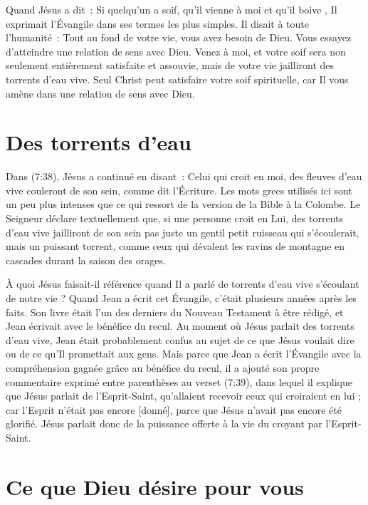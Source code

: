 Quand Jésus a dit~: \og Si quelqu'un a soif, qu'il vienne à moi
 et qu'il boive \fg{}, Il exprimait l'Évangile dans ses termes
 les plus simples. Il disait à toute l'humanité~:
 \og Tout au fond de votre vie, vous avez besoin de Dieu.
 Vous essayez d'atteindre une relation de sens avec Dieu.
 Venez à moi, et votre soif sera non seulement entièrement satisfaite
 et assouvie, mais de votre vie jailliront des torrents d'eau vive. \fg{}
 Seul Christ peut satisfaire votre soif spirituelle,
 car Il vous amène dans une relation de sens avec Dieu.


\section{Des torrents d'eau}

Dans (7:38), Jésus a continué en disant~:
 \og Celui qui croit en moi, des fleuves d'eau vive couleront de son sein,
 comme dit l'Écriture. \fg{}
 Les mots grecs utilisés ici sont un peu plus intenses que ce qui ressort
 de la version de la Bible à la Colombe. Le Seigneur déclare textuellement
 que, si une personne croit en Lui, \og des torrents d'eau vive jailliront
 de son sein \fg{} \ocadr pas juste un gentil petit ruisseau qui s'écoulerait,
 mais un puissant torrent, comme ceux qui dévalent les ravins de montagne
 en cascades durant la saison des orages.

À quoi Jésus faisait-il référence quand Il a parlé de
 \og torrents d'eau vive \fg{} s'écoulant de notre vie ?
 Quand Jean a écrit cet Évangile, c'était plusieurs années après les faits.
 Son livre était l'un des derniers du Nouveau Testament à être rédigé,
 et Jean écrivait avec le bénéfice du recul. Au moment où Jésus parlait
 des torrents d'eau vive, Jean était probablement confus au sujet de ce que
 Jésus voulait dire ou de ce qu'Il promettait aux gens.
 Mais parce que Jean a écrit l'Évangile avec la compréhension gagnée grâce
 au bénéfice du recul, il a ajouté son propre commentaire exprimé entre
 parenthèses au verset (7:39), dans lequel il explique que Jésus
 parlait de l'Esprit-Saint, \og qu'allaient recevoir ceux qui croiraient
 en lui ; car l'Esprit n'était pas encore [donné], parce que Jésus n'avait
 pas encore été glorifié. \fg{}
 Jésus parlait donc de la puissance offerte à la vie du croyant
 par l'Esprit-Saint.


\section{Ce que Dieu d\'esire pour vous}

